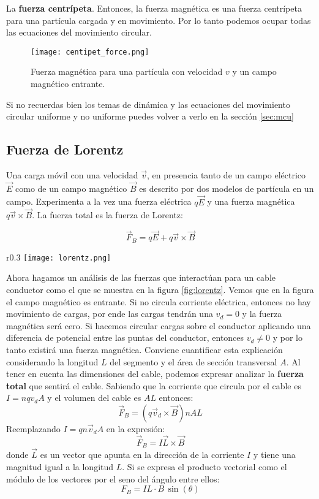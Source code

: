\noindent La \textbf{fuerza centrípeta}. Entonces, la fuerza magnética es una fuerza centrípeta para una partícula cargada y en movimiento. Por lo tanto podemos ocupar todas las ecuaciones del movimiento circular.

\begin{figure}[ht]
  \centering
  \texttt{[image: centipet\_force.png]}
  \caption{Fuerza magnética para una partícula con velocidad \(v\) y un campo magnético entrante.}
  \label{fig:centripet_force}
\end{figure}

Si no recuerdas bien los temas de dinámica y las ecuaciones del movimiento circular uniforme y no uniforme puedes volver a verlo en la sección \ref{sec:mcu}

\subsection{Fuerza de Lorentz}

Una carga móvil con una velocidad \(\vec{v}\), en presencia tanto de un campo eléctrico \(\vec{E}\) como de un campo magnético \(\vec{B}\) es descrito por dos modelos de partícula en un campo. Experimenta a la vez una fuerza eléctrica \(q\vec{E}\) y una fuerza magnética \(q\vec{v} \times \vec{B}\). La fuerza total es la fuerza de Lorentz:

\[
  \vec{F}_B = q\vec{E} + q\vec{v} \times \vec{B}
\]

\begin{wrapfigure}{r}{0.3\textwidth}
  \centering
  \texttt{[image: lorentz.png]}
  \caption{Un segmento de un alambre conduciendo corriente en un campo magnético \(\vec{B}\)}
  \label{fig:lorentz}
\end{wrapfigure}
Ahora hagamos un análisis de las fuerzas que interactúan para un cable conductor como el que se muestra en la figura \ref{fig:lorentz}. Vemos que en la figura el campo magnético es entrante. Si no circula corriente eléctrica, entonces no hay movimiento de cargas, por ende las cargas tendrán una \(v_d=0\) y la fuerza magnética será cero. Si hacemos circular cargas sobre el conductor aplicando una diferencia de potencial entre las puntas del conductor, entonces \(v_d \neq 0\) y por lo tanto existirá una fuerza magnética. 
Conviene cuantificar esta explicación considerando la longitud \(L\) del segmento y el área de sección transversal \(A\). Al tener en cuenta las dimensiones del cable, podemos expresar analizar la \textbf{fuerza total} que sentirá el cable. Sabiendo que la corriente que circula por el cable es \(I = nq v_d A\) y el volumen del cable es \(AL\) entonces: 
\[
  \vec{F}_B = (q\vec{v}_d \times \vec{B})nAL
\]
Reemplazando \(I=qn \vec{v}_d A\) en la expresión:
\[
  \vec{F}_B = I\vec{L} \times \vec{B}
\]
donde \(\vec{L}\) es un vector que apunta en la dirección de la corriente \(I\) y tiene una magnitud igual a la longitud \(L\). Si se expresa el producto vectorial como el módulo de los vectores por el seno del ángulo entre ellos:
\begin{equation}
  \boxed{F_B = IL \cdot B \, \sin(\theta)}
\end{equation}

